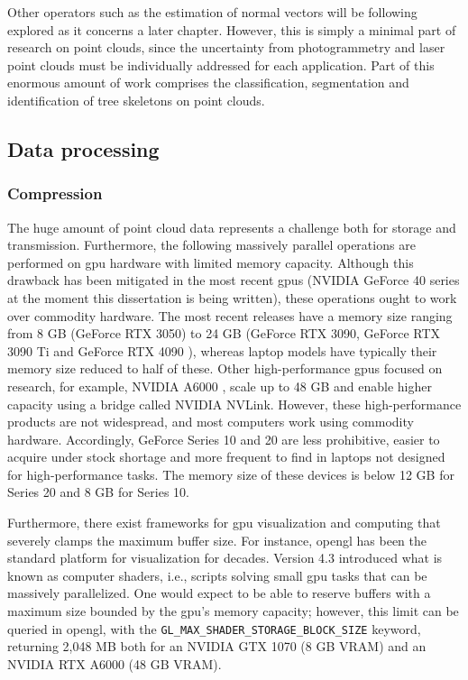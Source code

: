 Other operators such as the estimation of normal vectors will be following explored as it concerns a later chapter. However, this is simply a minimal part of research on point clouds, since the uncertainty from photogrammetry and laser point clouds must be individually addressed for each application. Part of this enormous amount of work comprises the classification, segmentation and identification of tree skeletons \cite{cardenas_reconstruction_2022} on point clouds. 

\subsection{Data processing}

\subsubsection{Compression}

The huge amount of point cloud data represents a challenge both for storage and transmission. Furthermore, the following massively parallel operations are performed on \acrshort{gpu} hardware with limited memory capacity. Although this drawback has been mitigated in the most recent \acrshort{gpu}s (NVIDIA GeForce 40 series at the moment this dissertation is being written), these operations ought to work over commodity hardware. The most recent releases have a memory size ranging from 8 GB (GeForce RTX 3050) to 24 GB (GeForce RTX 3090, GeForce RTX 3090 Ti \cite{nvidia_nvidia_nodate-2} and GeForce RTX 4090 \cite{nvidia_nvidia_nodate-1}), whereas laptop models have typically their memory size reduced to half of these. Other high-performance \acrshort{gpu}s focused on research, for example, NVIDIA A6000 \cite{nvidia_nvidia_nodate}, scale up to 48 GB and enable higher capacity using a bridge called NVIDIA NVLink. However, these high-performance products are not widespread, and most computers work using commodity hardware. Accordingly, GeForce Series 10 and 20 are less prohibitive, easier to acquire under stock shortage and more frequent to find in laptops not designed for high-performance tasks. The memory size of these devices is below 12 GB for Series 20 and 8 GB for Series 10. 

Furthermore, there exist frameworks for \acrshort{gpu} visualization and computing that severely clamps the maximum buffer size. For instance, \acrshort{opengl} has been the standard platform for visualization for decades. Version 4.3 introduced what is known as computer shaders, i.e., scripts solving small \acrshort{gpu} tasks that can be massively parallelized. One would expect to be able to reserve buffers with a maximum size bounded by the \acrshort{gpu}'s memory capacity; however, this limit can be queried in \acrshort{opengl}, with the \scriptsize \verb|GL_MAX_SHADER_STORAGE_BLOCK_SIZE| \normalsize keyword, returning 2,048 MB both for an NVIDIA GTX 1070 (8 GB VRAM) and an NVIDIA RTX A6000 (48 GB VRAM).

